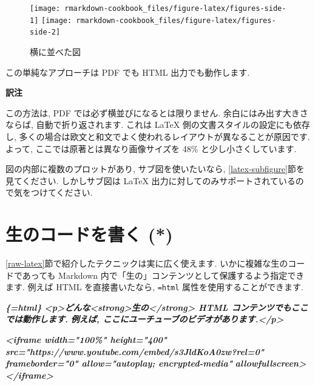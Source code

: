 \documentclass[
  11pt,
  lualatex,ja=standard,jafont=noto]{bxjsreport}
\newenvironment{Shaded}{\begin{snugshade}}{\end{snugshade}}
\newcommand{\InformationTok}[1]{\textcolor[rgb]{0.56,0.35,0.01}{\textbf{\textit{#1}}}}
\newenvironment{infobox}[1]{\begin{itemize}\renewcommand{\labelitemi}{\raisebox{-.7\height}[0pt][0pt]{%
  {\setkeys{Gin}{width=3em,keepaspectratio}\texttt{[image: \_latex/\_img/\#1]}}}}
  \setlength{\fboxsep}{1em}
  \begin{greyblock}
  \item
  }{\end{greyblock}\end{itemize}
}
\begin{document}
\begin{figure}

{\centering \texttt{[image: rmarkdown-cookbook\_files/figure-latex/figures-side-1]} \texttt{[image: rmarkdown-cookbook\_files/figure-latex/figures-side-2]} 

}

\caption{横に並べた図}\label{fig:figures-side}
\end{figure}

この単純なアプローチは PDF でも HTML 出力でも動作します.

\begin{infobox}{memo}
\textbf{訳注}

この方法は, PDF では必ず横並びになるとは限りません. 余白にはみ出す大きさならば, 自動で折り返されます. これは LaTeX 側の文書スタイルの設定にも依存し, 多くの場合は欧文と和文でよく使われるレイアウトが異なることが原因です. よって, ここでは原著とは異なり画像サイズを 48\% と少し小さくしています.

\end{infobox}

図の内部に複数のプロットがあり, サブ図を使いたいなら, \ref{latex-subfigure}節を見てください. しかしサブ図は LaTeX 出力に対してのみサポートされているので気をつけてください.

\hypertarget{raw-content}{%
\section{生のコードを書く (*)}\label{raw-content}}

\ref{raw-latex}節で紹介したテクニックは実に広く使えます. いかに複雑な生のコードであっても Markdown 内で「生の」コンテンツとして保護するよう指定できます. 例えば HTML を直接書いたなら, \texttt{=html} 属性を使用することができます.

\begin{Shaded}
\begin{Highlighting}[]
\InformationTok{\textasciigrave{}\textasciigrave{}\textasciigrave{}\{=html\}}
\InformationTok{\textless{}p\textgreater{}どんな\textless{}strong\textgreater{}生の\textless{}/strong\textgreater{} HTML コンテンツでもここでは動作します.}
\InformationTok{例えば, ここにユーチューブのビデオがあります.\textless{}/p\textgreater{}}

\InformationTok{\textless{}iframe width="100\%" height="400"}
\InformationTok{  src="https://www.youtube.com/embed/s3JldKoA0zw?rel=0"}
\InformationTok{  frameborder="0" allow="autoplay; encrypted{-}media"}
\InformationTok{  allowfullscreen\textgreater{}\textless{}/iframe\textgreater{}}
\InformationTok{\textasciigrave{}\textasciigrave{}\textasciigrave{}}
\end{Highlighting}
\end{Shaded}
\end{document}
